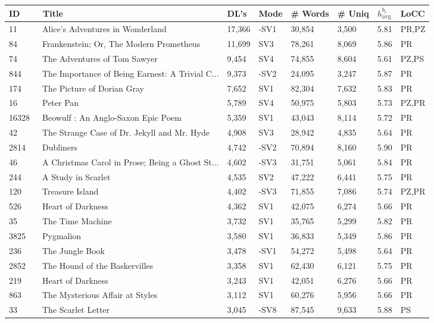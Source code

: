 \begin{longtable}{l | l | l | l | l | l | l | l}
ID & ~Title & DL's & Mode & \# Words & \# Uniq & $h_{{\textrm{{avg}}}}^{{b_i}}$ & LoCC\\
\hline
\endhead
11 & ~Alice's Adventures in Wonderland & 17,366 & -SV1 & 30,854 & 3,500 & 5.81 & PR,PZ\\
84 & ~Frankenstein; Or, The Modern Prometheus & 11,699 & SV3 & 78,261 & 8,069 & 5.86 & PR\\
74 & ~The Adventures of Tom Sawyer & 9,454 & SV4 & 74,855 & 8,604 & 5.61 & PZ,PS\\
844 & ~The Importance of Being Earnest: A Trivial C... & 9,373 & -SV2 & 24,095 & 3,247 & 5.87 & PR\\
174 & ~The Picture of Dorian Gray & 7,652 & SV1 & 82,304 & 7,632 & 5.83 & PR\\
16 & ~Peter Pan & 5,789 & SV4 & 50,975 & 5,803 & 5.73 & PZ,PR\\
16328 & ~Beowulf
: An Anglo-Saxon Epic Poem & 5,359 & SV1 & 43,043 & 8,114 & 5.72 & PR\\
42 & ~The Strange Case of Dr. Jekyll and Mr. Hyde & 4,908 & SV3 & 28,942 & 4,835 & 5.64 & PR\\
2814 & ~Dubliners & 4,742 & -SV2 & 70,894 & 8,160 & 5.90 & PR\\
46 & ~A Christmas Carol in Prose; Being a Ghost St... & 4,602 & -SV3 & 31,751 & 5,061 & 5.84 & PR\\
244 & ~A Study in Scarlet & 4,535 & SV2 & 47,222 & 6,441 & 5.75 & PR\\
120 & ~Treasure Island & 4,402 & -SV3 & 71,855 & 7,086 & 5.74 & PZ,PR\\
526 & ~Heart of Darkness & 4,362 & SV1 & 42,075 & 6,274 & 5.66 & PR\\
35 & ~The Time Machine & 3,732 & SV1 & 35,765 & 5,299 & 5.82 & PR\\
3825 & ~Pygmalion & 3,580 & SV1 & 36,833 & 5,349 & 5.86 & PR\\
236 & ~The Jungle Book & 3,478 & -SV1 & 54,272 & 5,498 & 5.64 & PR\\
2852 & ~The Hound of the Baskervilles & 3,358 & SV1 & 62,430 & 6,121 & 5.75 & PR\\
219 & ~Heart of Darkness & 3,243 & SV1 & 42,051 & 6,276 & 5.66 & PR\\
863 & ~The Mysterious Affair at Styles & 3,112 & SV1 & 60,276 & 5,956 & 5.66 & PR\\
33 & ~The Scarlet Letter & 3,045 & -SV8 & 87,545 & 9,633 & 5.88 & PS\\

\end{longtable}
